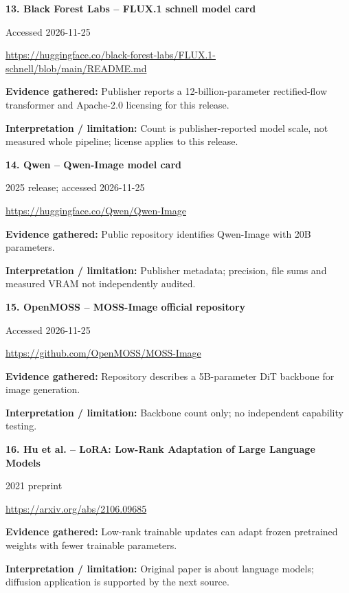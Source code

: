 \documentclass[11pt,a4paper]{article}
\begin{document}
\noindent\begin{minipage}{\linewidth}\textbf{13. Black Forest Labs -- FLUX.1 schnell model card}\par{\small Accessed 2026-11-25\par\url{https://huggingface.co/black-forest-labs/FLUX.1-schnell/blob/main/README.md}}\par
\textbf{Evidence gathered:} Publisher reports a 12-billion-parameter rectified-flow transformer and Apache-2.0 licensing for this release.\par\textbf{Interpretation / limitation:} Count is publisher-reported model scale, not measured whole pipeline; license applies to this release.\par
\end{minipage}\par\vspace{2mm}
\noindent\begin{minipage}{\linewidth}\textbf{14. Qwen -- Qwen-Image model card}\par{\small 2025 release; accessed 2026-11-25\par\url{https://huggingface.co/Qwen/Qwen-Image}}\par
\textbf{Evidence gathered:} Public repository identifies Qwen-Image with 20B parameters.\par\textbf{Interpretation / limitation:} Publisher metadata; precision, file sums and measured VRAM not independently audited.\par
\end{minipage}\par\vspace{2mm}
\noindent\begin{minipage}{\linewidth}\textbf{15. OpenMOSS -- MOSS-Image official repository}\par{\small Accessed 2026-11-25\par\url{https://github.com/OpenMOSS/MOSS-Image}}\par
\textbf{Evidence gathered:} Repository describes a 5B-parameter DiT backbone for image generation.\par\textbf{Interpretation / limitation:} Backbone count only; no independent capability testing.\par
\end{minipage}\par\vspace{2mm}
\noindent\begin{minipage}{\linewidth}\textbf{16. Hu et al. -- LoRA: Low-Rank Adaptation of Large Language Models}\par{\small 2021 preprint\par\url{https://arxiv.org/abs/2106.09685}}\par
\textbf{Evidence gathered:} Low-rank trainable updates can adapt frozen pretrained weights with fewer trainable parameters.\par\textbf{Interpretation / limitation:} Original paper is about language models; diffusion application is supported by the next source.\par
\end{minipage}\par\vspace{2mm}
\end{document}
